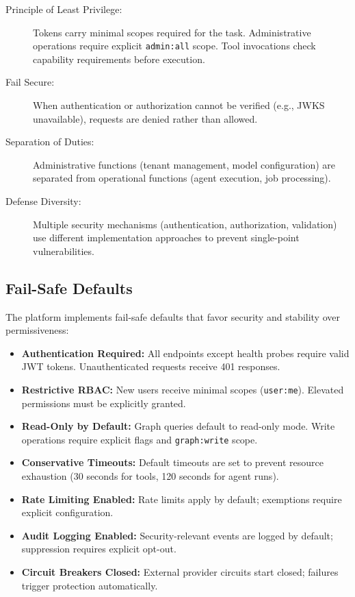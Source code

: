 \begin{description}
    \item[Principle of Least Privilege:] Tokens carry minimal scopes required for the task. Administrative operations require explicit \texttt{admin:all} scope. Tool invocations check capability requirements before execution.
    
    \item[Fail Secure:] When authentication or authorization cannot be verified (e.g., JWKS unavailable), requests are denied rather than allowed.
    
    \item[Separation of Duties:] Administrative functions (tenant management, model configuration) are separated from operational functions (agent execution, job processing).
    
    \item[Defense Diversity:] Multiple security mechanisms (authentication, authorization, validation) use different implementation approaches to prevent single-point vulnerabilities.
\end{description}

\subsection{Fail-Safe Defaults}
\label{subsec:fail-safe}

The platform implements fail-safe defaults that favor security and stability over permissiveness:

\begin{itemize}
    \item \textbf{Authentication Required:} All endpoints except health probes require valid JWT tokens. Unauthenticated requests receive 401 responses.
    
    \item \textbf{Restrictive RBAC:} New users receive minimal scopes (\texttt{user:me}). Elevated permissions must be explicitly granted.
    
    \item \textbf{Read-Only by Default:} Graph queries default to read-only mode. Write operations require explicit flags and \texttt{graph:write} scope.
    
    \item \textbf{Conservative Timeouts:} Default timeouts are set to prevent resource exhaustion (30 seconds for tools, 120 seconds for agent runs).
    
    \item \textbf{Rate Limiting Enabled:} Rate limits apply by default; exemptions require explicit configuration.
    
    \item \textbf{Audit Logging Enabled:} Security-relevant events are logged by default; suppression requires explicit opt-out.
    
    \item \textbf{Circuit Breakers Closed:} External provider circuits start closed; failures trigger protection automatically.
\end{itemize}

